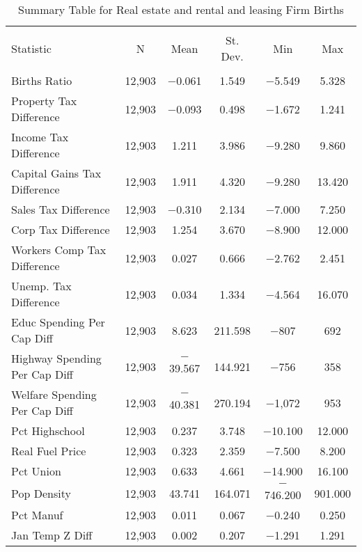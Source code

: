 
\begin{table}[!htbp] \centering 
  \caption{Summary Table for  Real estate and rental and leasing Firm Births} 
  \label{53summary} 
\begin{tabular}{@{\extracolsep{5pt}}lccccc} 
\\[-1.8ex]\hline 
\hline \\[-1.8ex] 
Statistic & \multicolumn{1}{c}{N} & \multicolumn{1}{c}{Mean} & \multicolumn{1}{c}{St. Dev.} & \multicolumn{1}{c}{Min} & \multicolumn{1}{c}{Max} \\ 
\hline \\[-1.8ex] 
Births Ratio & 12,903 & $-$0.061 & 1.549 & $-$5.549 & 5.328 \\ 
Property Tax Difference & 12,903 & $-$0.093 & 0.498 & $-$1.672 & 1.241 \\ 
Income Tax Difference & 12,903 & 1.211 & 3.986 & $-$9.280 & 9.860 \\ 
Capital Gains Tax Difference & 12,903 & 1.911 & 4.320 & $-$9.280 & 13.420 \\ 
Sales Tax Difference & 12,903 & $-$0.310 & 2.134 & $-$7.000 & 7.250 \\ 
Corp Tax Difference & 12,903 & 1.254 & 3.670 & $-$8.900 & 12.000 \\ 
Workers Comp Tax Difference & 12,903 & 0.027 & 0.666 & $-$2.762 & 2.451 \\ 
Unemp. Tax Difference & 12,903 & 0.034 & 1.334 & $-$4.564 & 16.070 \\ 
Educ Spending Per Cap Diff & 12,903 & 8.623 & 211.598 & $-$807 & 692 \\ 
Highway Spending Per Cap Diff & 12,903 & $-$39.567 & 144.921 & $-$756 & 358 \\ 
Welfare Spending Per Cap Diff & 12,903 & $-$40.381 & 270.194 & $-$1,072 & 953 \\ 
Pct Highschool & 12,903 & 0.237 & 3.748 & $-$10.100 & 12.000 \\ 
Real Fuel Price & 12,903 & 0.323 & 2.359 & $-$7.500 & 8.200 \\ 
Pct Union & 12,903 & 0.633 & 4.661 & $-$14.900 & 16.100 \\ 
Pop Density & 12,903 & 43.741 & 164.071 & $-$746.200 & 901.000 \\ 
Pct Manuf & 12,903 & 0.011 & 0.067 & $-$0.240 & 0.250 \\ 
Jan Temp Z Diff & 12,903 & 0.002 & 0.207 & $-$1.291 & 1.291 \\ 

\end{tabular}
\end{table}
